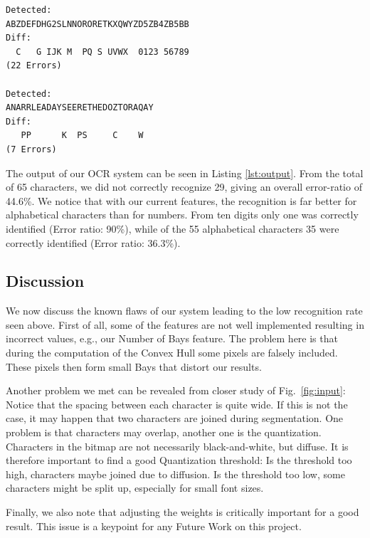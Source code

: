 \documentclass{article}
\begin{document}
\newpage

\begin{lstlisting}[caption={Result of our evaluation},label={lst:output}]
Detected: 
ABZDEFDHG2SLNNORORETKXQWYZD5ZB4ZB5BB
Diff:
  C   G IJK M  PQ S UVWX  0123 56789
(22 Errors)

Detected:
ANARRLEADAYSEERETHEDOZTORAQAY
Diff:
   PP      K  PS     C    W  
(7 Errors)
\end{lstlisting}

The output of our OCR system can be seen in Listing \ref{lst:output}. From the total of 65 characters, we did not correctly recognize 29, giving an overall error-ratio of 44.6\%.
We notice that with our current features, the recognition is far better for alphabetical characters than for numbers. From ten digits only one was correctly identified (Error ratio: 90\%), while of the 55 alphabetical characters 35 were correctly identified (Error ratio: 36.3\%). 

\subsection{Discussion}
We now discuss the known flaws of our system leading to the low recognition rate seen above. First of all, some of the features are not well implemented resulting in incorrect values, e.g., our Number of Bays feature. The problem here is that during the computation of the Convex Hull some pixels are falsely included. These pixels then form small Bays that distort our results.

Another problem we met can be revealed from closer study of Fig.~\ref{fig:input}: Notice that the spacing between each character is quite wide. If this is not the case, it may happen that two characters are joined during segmentation. One problem is that characters may overlap, another one is the quantization. Characters in the bitmap are not necessarily black-and-white, but diffuse. It is therefore important to find a good Quantization threshold: Is the threshold too high, characters maybe joined due to diffusion. Is the threshold too low, some characters might be split up, especially for small font sizes.

Finally, we also note that adjusting the weights is critically important for a good result. This issue is a keypoint for any Future Work on this project.
\end{document}
